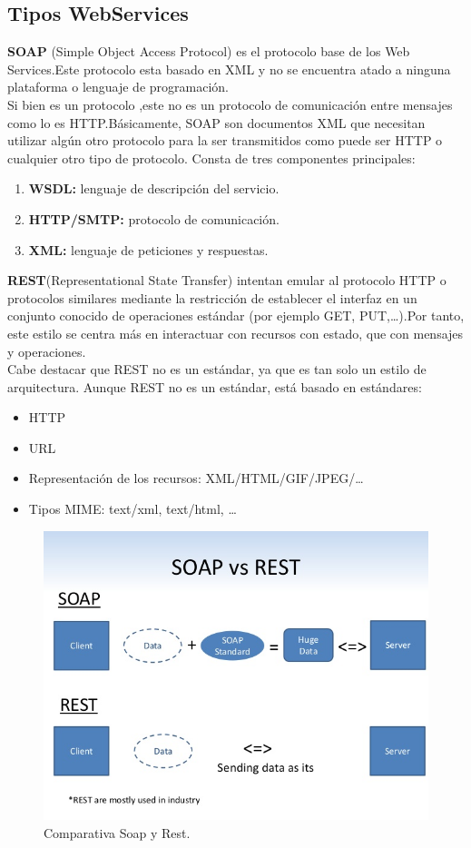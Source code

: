 \subsection{Tipos WebServices}
\textbf{SOAP}\cite{tipoWebServices} (Simple Object Access Protocol) es el protocolo base de los Web Services.Este protocolo esta basado en XML y no se encuentra atado a ninguna plataforma o lenguaje de programación.
\\Si bien es un protocolo ,este no es un protocolo de comunicación entre mensajes como lo es HTTP.Básicamente, SOAP son documentos XML que necesitan utilizar algún otro protocolo para la ser transmitidos como puede ser HTTP o cualquier otro tipo de protocolo.
Consta de tres componentes principales:
\begin{enumerate}
  \item \textbf{WSDL:} lenguaje de descripción del servicio.
  \item \textbf{HTTP/SMTP:} protocolo de comunicación.
  \item \textbf{XML: }lenguaje de peticiones y respuestas.
\end{enumerate}
\textbf{REST}(Representational State Transfer) intentan emular al protocolo HTTP o protocolos similares mediante la restricción de establecer el interfaz en un conjunto conocido de operaciones estándar (por ejemplo GET, PUT,…).Por tanto, este estilo se centra más en interactuar con recursos con estado, que con mensajes y operaciones.  
\\Cabe destacar que REST no es un estándar, ya que es tan solo un estilo de arquitectura.
Aunque REST no es un estándar, está basado en estándares:
\begin{itemize}
\item HTTP
\item URL
\item Representación de los recursos: XML/HTML/GIF/JPEG/…
\item Tipos MIME: text/xml, text/html, … 
\end{itemize}
\begin{figure}[!h]
\begin{center}
   \includegraphics[width=0.5\linewidth]{Figures/Soap_Rest}
	\decoRule
	\caption[Comparativa Soap y Rest]{Comparativa Soap y Rest.}
\label{fig:Soap_Rest}
\end{center}
\end{figure}
